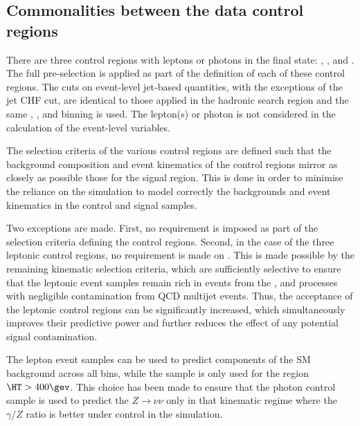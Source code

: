 
\subsection{Commonalities between the data control regions}

There are three control regions with leptons or photons in the final
state: \mj, \mmj, and \gj. 
The full pre-selection is applied as part of the definition of each of these control
regions. The cuts on event-level jet-based quantities, with the exceptions of the jet CHF cut, 
are identical to those applied in the hadronic search region and the same \njet, \nb,
and \scalht binning is used. The lepton(s) or photon is not considered
in the calculation of the event-level variables.

The selection criteria of the various control regions are defined such
that the background composition and event kinematics of the control
regions mirror as closely as possible those for the signal
region. This is done in order to minimise the reliance on the
simulation to model correctly the backgrounds and event kinematics in
the control and signal samples.

Two exceptions are made. First, no \bdphi requirement is imposed as
part of the selection criteria defining the control regions. Second,
in the case of the three leptonic control regions, no requirement is
made on \alphat. This is made possible by the remaining kinematic
selection criteria, which are sufficiently selective to ensure that
the leptonic event samples remain rich in events from the \wj, \ttbar
and \zll processes with negligible contamination from QCD multijet
events. Thus, the acceptance of the leptonic control regions can be
significantly increased, which simultaneously improves their
predictive power and further reduces the effect of any potential
signal contamination.

The lepton event samples can be used to predict components of the SM
background across all \scalht bins, while the \gj sample is only 
used for the region $\HT > 400\gev$. 
This choice has been made to ensure that the photon control sample 
is used to predict the $Z\rightarrow\nu\nu$ only in that 
kinematic regime where the $\gamma/Z$ ratio is better under control in the simulation. 

